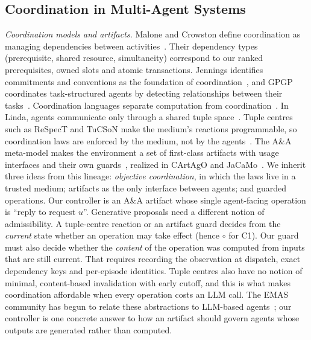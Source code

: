 \subsection{Coordination in Multi-Agent Systems}
\emph{Coordination models and artifacts.} Malone and Crowston define coordination as managing dependencies between activities~\cite{malone1994coordination}. Their dependency types (prerequisite, shared resource, simultaneity) correspond to our ranked prerequisites, owned slots and atomic transactions. Jennings identifies commitments and conventions as the foundation of coordination~\cite{jennings1993commitments}, and GPGP coordinates task-structured agents by detecting relationships between their tasks~\cite{decker1995gpgp}. Coordination languages separate computation from coordination~\cite{gelernter1992coordination}. In Linda, agents communicate only through a shared tuple space~\cite{gelernter1985linda}. Tuple centres such as ReSpecT and TuCSoN make the medium's reactions programmable, so coordination laws are enforced by the medium, not by the agents~\cite{omicini2001tuple,omicini2001coordination}. The A\&A meta-model makes the environment a set of first-class artifacts with usage interfaces and their own guards~\cite{omicini2008artifacts,weyns2007environment}, realized in CArtAgO and JaCaMo~\cite{ricci2011environment,boissier2013jacamo}. We inherit three ideas from this lineage: \emph{objective coordination}, in which the laws live in a trusted medium; artifacts as the only interface between agents; and guarded operations. Our controller is an A\&A artifact whose single agent-facing operation is ``reply to request $u$''. Generative proposals need a different notion of admissibility. A tuple-centre reaction or an artifact guard decides from the \emph{current} state whether an operation may take effect (hence $\circ$ for C1). Our guard must also decide whether the \emph{content} of the operation was computed from inputs that are still current. That requires recording the observation at dispatch, exact dependency keys and per-episode identities. Tuple centres also have no notion of minimal, content-based invalidation with early cutoff, and this is what makes coordination affordable when every operation costs an LLM call. The EMAS community has begun to relate these abstractions to LLM-based agents~\cite{ciortea2025eumas}; our controller is one concrete answer to how an artifact should govern agents whose outputs are generated rather than computed.

